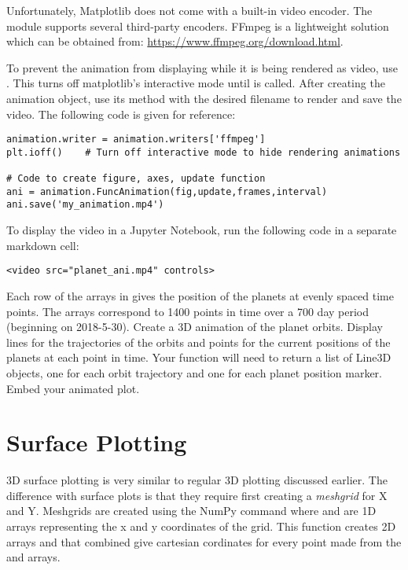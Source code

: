 Unfortunately, Matplotlib does not come with a built-in video encoder.
The  module supports several third-party encoders. FFmpeg is a lightweight solution which can be obtained from: \href{https://www.ffmpeg.org/download.html}{https://www.ffmpeg.org/download.html}.

To prevent the animation from displaying while it is being rendered as video, use .
This turns off matplotlib's interactive mode until  is called.
After creating the animation object, use its  method with the desired filename to render and save the video. The following code is given for reference:

\begin{lstlisting}
animation.writer = animation.writers['ffmpeg']
plt.ioff()    # Turn off interactive mode to hide rendering animations

# Code to create figure, axes, update function
ani = animation.FuncAnimation(fig,update,frames,interval)
ani.save('my_animation.mp4')
\end{lstlisting}
To display the  video in a Jupyter Notebook, run the following code in a separate markdown cell:
\begin{lstlisting}
<video src="planet_ani.mp4" controls>
\end{lstlisting}

\begin{problem}
Each row of the arrays in  gives the position of the planets at evenly spaced time points. The arrays correspond to 1400 points in time over a 700 day period (beginning on 2018-5-30).
Create a 3D animation of the planet orbits.
Display lines for the trajectories of the orbits and points for the current positions of the planets at each point in time.
Your  function will need to return a list of Line3D objects, one for each orbit trajectory and one for each planet position marker.
Embed your animated plot.
\end{problem}

\section*{Surface Plotting}
3D surface plotting is very similar to regular 3D plotting discussed earlier.
The difference with surface plots is that they require first creating a \textit{meshgrid} for X and Y. Meshgrids are created using the NumPy command  where  and  are 1D arrays representing the x and y coordinates of the grid.
This function creates 2D arrays  and  that combined give cartesian cordinates for every point made from the  and  arrays. 

